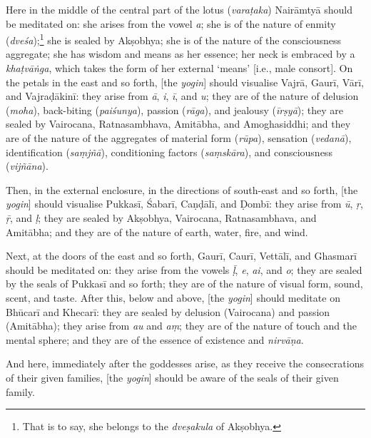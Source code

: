 \documentclass[naipra.tex]{subfiles}
\begin{document}
Here in the middle of the central part of the lotus (\emph{varaṭaka}) Nairāmtyā should be meditated on: she arises from the vowel \emph{a}; she is of the nature of enmity (\emph{dveśa});\footnote{
	That is to say, she belongs to the \emph{dveṣakula} of Akṣobhya.
} she is sealed by Akṣobhya; she is of the nature of the consciousness aggregate; she has wisdom and means as her essence; her neck is embraced by a \emph{khaṭvāṅga}, which takes the form of her external `means' [i.e., male consort].
On the petals in the east and so forth, [the \emph{yogin}] should visualise Vajrā, Gaurī, Vārī, and Vajraḍākinī: they arise from \emph{ā}, \emph{i}, \emph{ī}, and \emph{u}; they are of the nature of delusion (\emph{moha}), back-biting (\emph{paiśunya}), passion (\emph{rāga}), and jealousy (\emph{īrṣyā}); they are sealed by Vairocana, Ratnasambhava, Amitābha, and Amoghasiddhi; and they are of the nature of the aggregates of material form (\emph{rūpa}), sensation (\emph{vedanā}), identification (\emph{saṃjñā}), conditioning factors (\emph{saṃskāra}), and consciousness (\emph{vijñāna}).

Then, in the external enclosure, in the directions of south-east and so forth, [the \emph{yogin}] should visualise Pukkasī, Śabarī, Caṇḍālī, and Ḍombī: they arise from \emph{ū}, \emph{ṛ}, \emph{ṝ}, and \emph{ḷ}; they are sealed by Akṣobhya, Vairocana, Ratnasambhava, and Amitābha; and they are of the nature of earth, water, fire, and wind.

Next, at the doors of the east and so forth, Gaurī, Caurī, Vettālī, and Ghasmarī should be meditated on: they arise from the vowels \emph{ḹ}, \emph{e}, \emph{ai}, and \emph{o}; they are sealed by the seals of Pukkasī and so forth; they are of the nature of visual form, sound, scent, and taste.
After this, below and above, [the \emph{yogin}] should meditate on Bhūcarī and Khecarī: they are sealed by delusion (Vairocana) and passion (Amitābha); they arise from \emph{au} and \emph{aṃ}; they are of the nature of touch and the mental sphere; and they are of the essence of existence and \emph{nirvāṇa}.

And here, immediately after the goddesses arise, as they receive the consecrations of their given families, [the \emph{yogin}] should be aware of the seals of their given family. 
\end{document}
